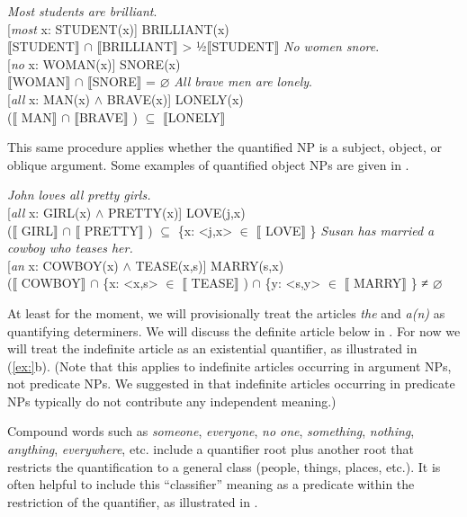 \ea
\ea  \textit{Most students are brilliant}.\\
{}[\textit{most} x: STUDENT(x)] BRILLIANT(x)\\
{\textbar} \textsc{$\llbracket$}STUDENT$\rrbracket$  ${\cap}$ \textsc{$\llbracket$}BRILLIANT$\rrbracket$  {\textbar}  >  ½\textsc{{\textbar}}\textsc{$\llbracket$}STUDENT$\rrbracket$ {\textbar}
\ex \textit{No women snore}.\\
{}[\textit{no} x: WOMAN(x)] SNORE(x)\\
\textsc{$\llbracket$}WOMAN$\rrbracket$  ${\cap}$ \textsc{$\llbracket$}SNORE$\rrbracket$  = ⌀
\ex   \textit{All brave men are lonely}.\\
{}[\textit{all} x: MAN(x) $\wedge$ BRAVE(x)] LONELY(x)\\
\textsc{($\llbracket$ }MAN$\rrbracket$  ${\cap}$ \textsc{$\llbracket$}BRAVE$\rrbracket$ )  ${\subseteq}$ \textsc{$\llbracket$}LONELY$\rrbracket$ 
\z \z


This same procedure applies whether the quantified NP is a subject, object, or oblique argument. Some examples of quantified object NPs are given in .


\ea
\ea \textit{John loves all pretty girls.}\\
{}[\textit{all} x: GIRL(x) $\wedge$ PRETTY(x)] LOVE(j,x)\\
($\llbracket$ GIRL$\rrbracket$  ${\cap}$ $\llbracket$ PRETTY$\rrbracket$ ) ${\subseteq}$ \{x: <j,x> ${\in}$ $\llbracket$ LOVE$\rrbracket$ \}
\ex \textit{Susan has married a cowboy who teases her.}\\
{}[\textit{an} x: COWBOY(x) $\wedge$ TEASE(x,s)] MARRY(s,x)\\
($\llbracket$ COWBOY$\rrbracket$  ${\cap}$ \{x: <x,s> ${\in}$ $\llbracket$ TEASE$\rrbracket$ ) ${\cap}$ \{y: <s,y> ${\in}$ $\llbracket$ MARRY$\rrbracket$ \} ≠ ⌀
\z \z


At least for the moment, we will provisionally treat the articles \textit{the} and \textit{a(n)} as quantifying determiners. We will discuss the definite article below in . For now we will treat the indefinite article as an existential quantifier, as illustrated in (\ref{ex:}b). (Note that this applies to indefinite articles occurring in argument NPs, not predicate NPs. We suggested in  that indefinite articles occurring in predicate NPs typically do not contribute any independent meaning.)



Compound words such as \textit{someone}, \textit{everyone}, \textit{no one}, \textit{something}, \textit{nothing}, \textit{anything}, \textit{everywhere}, etc. include a quantifier root plus another root that restricts the quantification to a general class (people, things, places, etc.). It is often helpful to include this “classifier” meaning as a predicate within the restriction of the quantifier, as illustrated in .


